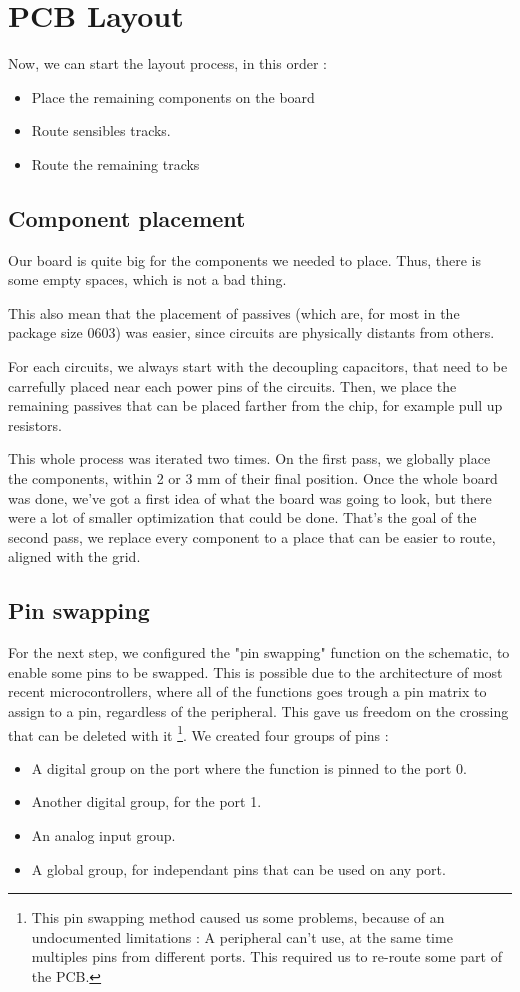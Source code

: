 \section{PCB Layout}
Now, we can start the layout process, in this order :

\begin{itemize}[noitemsep]
    \item   Place the remaining components on the board
    \item   Route sensibles tracks.
    \item   Route the remaining tracks
\end{itemize}

\subsection{Component placement}
Our board is quite big for the components we needed to place. Thus, there is some empty spaces,
which is not a bad thing.

This also mean that the placement of passives (which are, for most in the package size 0603) was
easier, since circuits are physically distants from others.

For each circuits, we always start with the decoupling capacitors, that need to be carrefully
placed near each power pins of the circuits. Then, we place the remaining passives that can
be placed farther from the chip, for example pull up resistors.

This whole process was iterated two times. On the first pass, we globally place the components,
within 2 or 3 mm of their final position. Once the whole board was done, we've got a first idea
of what the board was going to look, but there were a lot of smaller optimization that could be
done. That's the goal of the second pass, we replace every component to a place that can be easier
to route, aligned with the grid.

\subsection{Pin swapping}
For the next step, we configured the "pin swapping" function on the schematic, to enable some pins
to be swapped. This is possible due to the architecture of most recent microcontrollers, where all
of the functions goes trough a pin matrix to assign to a pin, regardless of the peripheral. This
gave us freedom on the crossing that can be deleted with it \footnote{
    This pin swapping method caused us some problems, because of an undocumented limitations : A
    peripheral can't use, at the same time multiples pins from different ports. This required
    us to re-route some part of the PCB.
}.
We created four groups of pins :
\begin{itemize}[noitemsep]
    \item   A digital group on the port where the function is pinned to the port 0.
    \item   Another digital group, for the port 1.
    \item   An analog input group.
    \item   A global group, for independant pins that can be used on any port.
\end{itemize}

